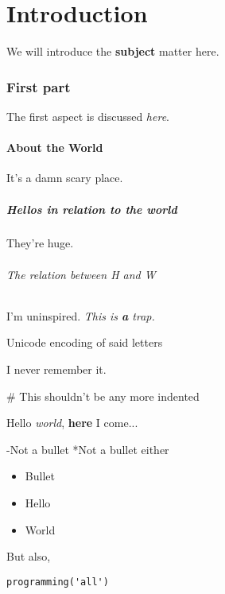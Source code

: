 \documentclass{article}
\begin{document}
\part*{Introduction}

We will introduce the \textbf{subject} matter here.

\section*{First part}

The first aspect is discussed \textit{here}.

\subsection*{About the World}

It's a damn scary place.

\subsubsection*{Hellos in relation to the world}

They're huge.

\paragraph{The relation between H and W}\mbox{}\newline

I'm uninspired. \textit{This is \textbf{a} trap.}

\subparagraph{Unicode encoding of said letters}\mbox{}\newline

I never remember it.

\subparagraph{\# This shouldn't be any more indented}\mbox{}\newline

Hello \textit{world}, \textbf{here} I come...

-Not a bullet
*Not a bullet either

\begin{itemize}
\item  Bullet
\item  Hello
\item  World

\end{itemize}

But also,


\begin{verbatim}
programming('all')
\end{verbatim}
\end{document}
